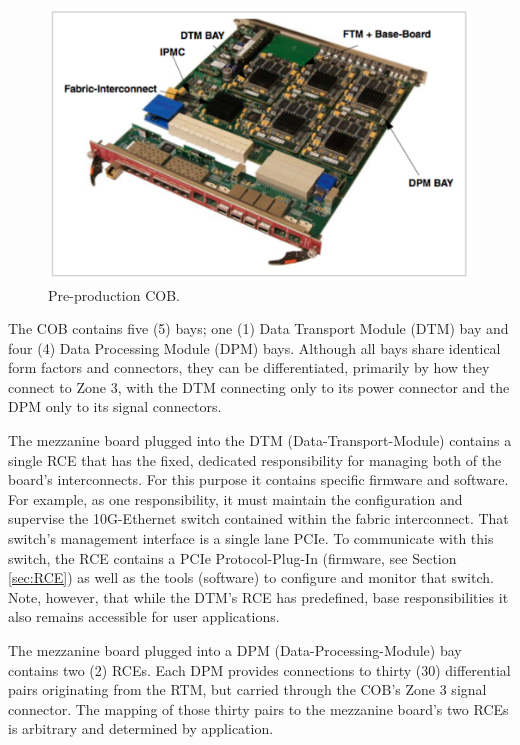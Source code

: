 \begin{figure}[tbh]
\includegraphics[scale=0.8]{cob-photo.pdf}
\caption{Pre-production COB.  }
\label{fig:cob}
\end{figure} 


The COB contains five (5) bays; one (1) Data Transport Module (DTM) bay 
and four (4) Data Processing Module (DPM) bays. 
Although all bays share identical form factors and connectors, 
they can be differentiated, primarily by how they connect to Zone 3,
with the DTM connecting only to its power connector and the DPM 
only to its signal connectors.

The mezzanine board plugged into the DTM (Data-Transport-Module) 
contains a single RCE that has the fixed, dedicated responsibility for 
managing both of the board's interconnects. 
For this purpose it contains specific firmware and software. 
For example, as one responsibility, it must maintain the 
configuration and supervise the 10G-Ethernet switch contained 
within the fabric interconnect. 
That switch's management interface is a single lane PCIe. 
To communicate with this switch, the RCE contains a 
PCIe Protocol-Plug-In (firmware, see Section \ref{sec:RCE}) 
as well as the tools (software) to configure and monitor that switch. 
Note, however, that while the DTM's RCE has predefined, base 
responsibilities it also remains accessible for user applications.

The mezzanine board plugged into a DPM (Data-Processing-Module)
bay contains two (2) RCEs. 
Each DPM provides connections to thirty 
(30) differential pairs originating from the RTM, 
but carried through the COB's Zone 3 signal connector. 
The mapping of those thirty pairs to the mezzanine board's 
two RCEs is arbitrary and determined by application. 


